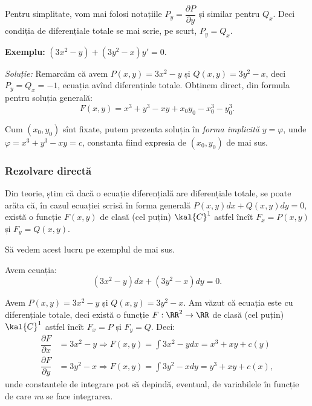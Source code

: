 \begin{remark}\label{rk:partial}
  Pentru simplitate, vom mai folosi notațiile $P_y = \dfrac{\partial P}{\partial y}$ și
  similar pentru $Q_x$. Deci condiția de diferențiale totale se mai scrie, pe scurt, $P_y = Q_x$.
\end{remark}

\vspace{0.5cm}

\textbf{Exemplu:} $(3x^2 - y) + (3y^2 - x) y' = 0$.

\emph{Soluție:} Remarcăm că avem $P(x, y) = 3x^2 - y$ și $Q(x, y) = 3y^2 - x$, deci
$P_y = Q_x = -1$, ecuația avînd diferențiale totale. Obținem direct, din formula
pentru soluția generală:
\[
  F(x, y) = x^3 + y^3 - xy + x_0y_0 - x_0^3 - y_0^3.
\]

Cum $(x_0, y_0)$ sînt fixate, putem prezenta soluția în \emph{forma implicită} $y = \varphi$,
unde $\varphi = x^3 + y^3 - xy = c$, constanta fiind expresia de $(x_0, y_0)$ de mai sus.


\subsubsection{Rezolvare directă}

Din teorie, știm că dacă o ecuație diferențială are diferențiale totale, se poate
arăta că, în cazul ecuației scrisă în forma generală $ P(x, y) dx + Q(x, y) dy = 0 $,
există o funcție $ F(x, y) $ de clasă (cel puțin) $\kal{C}^1$ astfel încît
$ F_x = P(x, y) $ și $ F_y = Q(x, y) $.

Să vedem acest lucru pe exemplul de mai sus.

Avem ecuația:
\[
  (3x^2 - y)dx + (3y^2 - x) dy = 0.
\]

Avem $P(x,y) = 3x^2 - y $ și $ Q(x,y) = 3y^2 - x$. Am văzut că ecuația este
cu diferențiale totale, deci există o funcție $ F : \RR^2 \to \RR $ de clasă (cel puțin)
$ \kal{C}^1 $ astfel încît $ F_x = P $ și $ F_y = Q $. Deci:
\begin{align*}
  \dfrac{\partial F}{\partial x} &= 3x^2 - y \Rightarrow F(x, y) = \int 3x^2 - y dx = %
                                   x^3 + xy + c(y) \\
  \dfrac{\partial F}{\partial y} &= 3y^2 - x \Rightarrow F(x, y) = \int 3y^2 - x dy = %
                                   y^3 + xy + c(x),
\end{align*}
unde constantele de integrare pot să depindă, eventual, de variabilele în funcție
de care \emph{nu} se face integrarea.

